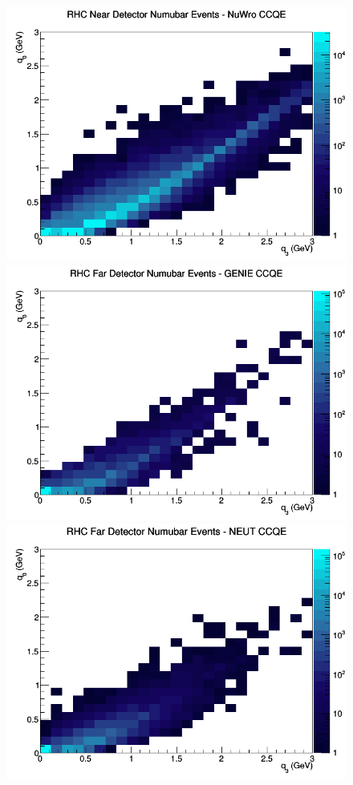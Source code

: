 \begin{figure}[h]
\includegraphics[width=\linewidth]{eff_q0_q3/LAr/CCQE_RHC_ND_numubar_q3_q0_NuWro.png}
\endminipage
\newline
{}
\includegraphics[width=\linewidth]{eff_q0_q3/LAr/CCQE_RHC_FD_numubar_q3_q0_GENIE.png}
\endminipage
{}
\includegraphics[width=\linewidth]{eff_q0_q3/LAr/CCQE_RHC_FD_numubar_q3_q0_NEUT.png}

\end{figure}
